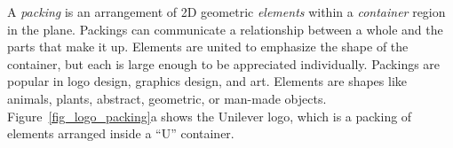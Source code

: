 



A \textit{packing} is an arrangement of 2D geometric
\textit{elements} within a \textit{container} region in the plane.
Packings can communicate a relationship between a whole and the parts that make it up.
Elements are united to emphasize the shape of the container,
but each is large enough to be appreciated individually.
Packings are popular in logo design, graphics design, and art.
Elements are shapes like animals, plants, abstract, geometric, or man-made objects.
Figure~\ref{fig_logo_packing}a shows the Unilever logo,
which is a packing of elements arranged inside a ``U'' container.



